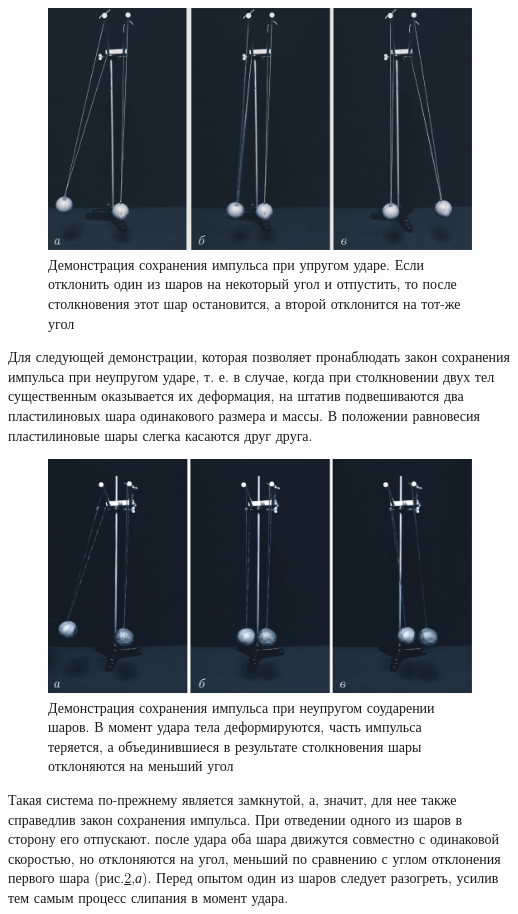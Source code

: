\documentclass[14pt,a4paper,oneside]{extarticle}	%
\begin{document}
	\begin{figure}[H]
			\centering	
			\includegraphics[width=0.9\linewidth]{hit-2.png}
			\caption{Демонстрация сохранения импульса при упругом ударе. Если отклонить один из шаров на некоторый угол и отпустить, то после столкновения этот шар остановится, а второй отклонится на тот-же угол}
			\label{hit-2}
		\end{figure}

Для следующей демонстрации, которая позволяет пронаблюдать закон сохранения импульса при неупругом ударе, т. е. в случае, когда при столкновении двух тел существенным оказывается их деформация, на штатив подвешиваются два пластилиновых шара одинакового размера и массы.
В положении равновесия пластилиновые шары слегка касаются друг друга.

	\begin{figure}[H]
	\centering	
	\includegraphics[width=0.9\linewidth]{hit-3.png}
	\caption{Демонстрация сохранения импульса при неупругом соударении шаров. В момент удара тела деформируются, часть импульса теряется, а объединившиеся в результате столкновения шары отклоняются на меньший угол}
	\label{hit-3}
\end{figure}

Такая система по-прежнему является замкнутой, а, значит, для нее также справедлив закон сохранения импульса.
При отведении одного из шаров в сторону его отпускают.
после удара оба шара движутся совместно с одинаковой скоростью, но отклоняются на угол, меньший по сравнению с углом отклонения первого шара (рис.\ref{hit-3},\textit{а}).
Перед опытом один из шаров следует разогреть, усилив тем самым процесс слипания в момент удара.
\end{document}
